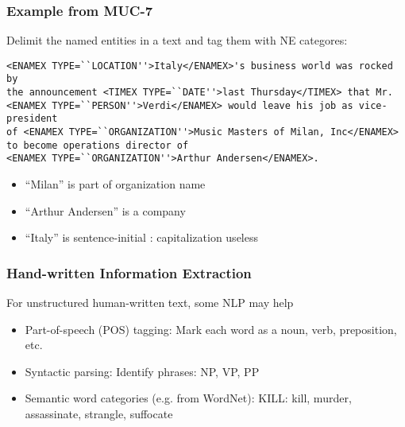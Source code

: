 \begin{frame}[fragile]\frametitle{Example from MUC-7}
Delimit the named entities in a text and tag them with NE categores:

  \begin{lstlisting}
<ENAMEX TYPE=``LOCATION''>Italy</ENAMEX>'s business world was rocked by
the announcement <TIMEX TYPE=``DATE''>last Thursday</TIMEX> that Mr.
<ENAMEX TYPE=``PERSON''>Verdi</ENAMEX> would leave his job as vice-president
of <ENAMEX TYPE=``ORGANIZATION''>Music Masters of Milan, Inc</ENAMEX> 
to become operations director of  
<ENAMEX TYPE=``ORGANIZATION''>Arthur Andersen</ENAMEX>.
  \end{lstlisting}
  
  \begin{itemize}
  \item ``Milan'' is part of organization name
  \item ``Arthur Andersen'' is a company 
  \item ``Italy'' is sentence-initial : capitalization useless
  \end{itemize}
\end{frame}

\begin{frame}[fragile]\frametitle{Hand-written Information Extraction}
For unstructured human-written text, some NLP may help
  \begin{itemize}
  \item Part-of-speech (POS) tagging: Mark each word as a noun, verb, preposition, etc.
  \item Syntactic parsing: Identify phrases: NP, VP, PP
  \item Semantic word categories (e.g. from WordNet): KILL: kill, murder, assassinate, strangle, suffocate
  \end{itemize}
\end{frame}






